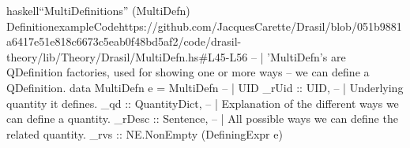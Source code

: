 \begin{codeSnippet}{haskell}{``MultiDefinitions'' (MultiDefn) Definition}{exampleCode}{https://github.com/JacquesCarette/Drasil/blob/051b9881a6417e51e818c6673c5eab0f48bd5af2/code/drasil-theory/lib/Theory/Drasil/MultiDefn.hs\#L45-L56}
-- | 'MultiDefn's are QDefinition factories, used for showing one or more ways
--   we can define a QDefinition.
data MultiDefn e = MultiDefn{
  -- | UID
  _rUid :: UID,
  -- | Underlying quantity it defines.
  _qd :: QuantityDict,
  -- | Explanation of the different ways we can define a quantity.
  _rDesc :: Sentence,
  -- | All possible ways we can define the related quantity.
  _rvs :: NE.NonEmpty (DefiningExpr e)
}
\end{codeSnippet}
